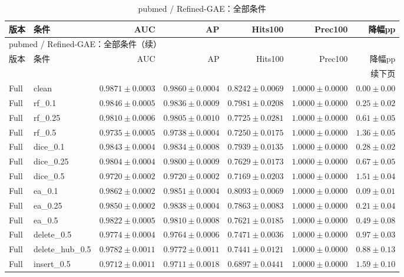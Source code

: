 \documentclass[UTF8,a4paper,11pt,fontset=fandol]{ctexart}
\begin{document}
{\footnotesize
\setlength{\tabcolsep}{3pt}
\begin{longtable}{llrrrrr}
\caption{pubmed / Refined-GAE：全部条件}\\
\toprule
版本 & 条件 & AUC & AP & Hits100 & Prec100 & 降幅pp \\
\midrule
\endfirsthead
\multicolumn{7}{l}{pubmed / Refined-GAE：全部条件（续）}\\
\toprule
版本 & 条件 & AUC & AP & Hits100 & Prec100 & 降幅pp \\
\midrule
\endhead
\midrule\multicolumn{7}{r}{续下页}\\
\endfoot
\bottomrule\endlastfoot
Full & clean & $0.9871\pm0.0003$ & $0.9860\pm0.0004$ & $0.8242\pm0.0069$ & $1.0000\pm0.0000$ & $0.00\pm0.00$ \\
Full & rf\_0.1 & $0.9846\pm0.0005$ & $0.9836\pm0.0009$ & $0.7981\pm0.0208$ & $1.0000\pm0.0000$ & $0.25\pm0.02$ \\
Full & rf\_0.25 & $0.9810\pm0.0006$ & $0.9805\pm0.0010$ & $0.7725\pm0.0281$ & $1.0000\pm0.0000$ & $0.61\pm0.05$ \\
Full & rf\_0.5 & $0.9735\pm0.0005$ & $0.9738\pm0.0004$ & $0.7250\pm0.0175$ & $1.0000\pm0.0000$ & $1.36\pm0.05$ \\
Full & dice\_0.1 & $0.9843\pm0.0004$ & $0.9834\pm0.0008$ & $0.7939\pm0.0135$ & $1.0000\pm0.0000$ & $0.28\pm0.02$ \\
Full & dice\_0.25 & $0.9804\pm0.0004$ & $0.9800\pm0.0009$ & $0.7629\pm0.0173$ & $1.0000\pm0.0000$ & $0.67\pm0.05$ \\
Full & dice\_0.5 & $0.9720\pm0.0002$ & $0.9720\pm0.0002$ & $0.7169\pm0.0203$ & $1.0000\pm0.0000$ & $1.51\pm0.04$ \\
Full & ea\_0.1 & $0.9862\pm0.0002$ & $0.9851\pm0.0004$ & $0.8093\pm0.0069$ & $1.0000\pm0.0000$ & $0.09\pm0.01$ \\
Full & ea\_0.25 & $0.9850\pm0.0002$ & $0.9838\pm0.0004$ & $0.7863\pm0.0083$ & $1.0000\pm0.0000$ & $0.21\pm0.04$ \\
Full & ea\_0.5 & $0.9822\pm0.0005$ & $0.9810\pm0.0008$ & $0.7621\pm0.0185$ & $1.0000\pm0.0000$ & $0.49\pm0.08$ \\
Full & delete\_0.5 & $0.9774\pm0.0004$ & $0.9764\pm0.0006$ & $0.7471\pm0.0036$ & $1.0000\pm0.0000$ & $0.97\pm0.03$ \\
Full & delete\_hub\_0.5 & $0.9782\pm0.0011$ & $0.9772\pm0.0011$ & $0.7441\pm0.0121$ & $1.0000\pm0.0000$ & $0.88\pm0.13$ \\
Full & insert\_0.5 & $0.9712\pm0.0011$ & $0.9711\pm0.0018$ & $0.6897\pm0.0441$ & $1.0000\pm0.0000$ & $1.59\pm0.10$ \\

\end{longtable}}
\end{document}

